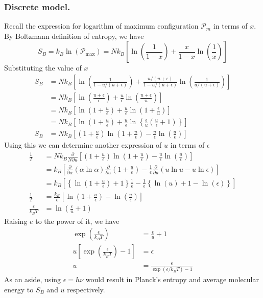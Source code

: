 \documentclass[../../../Main.tex]{subfiles}
\begin{document}
\subsubsection{Discrete model.} Recall the expression for logarithm of maximum configuration $\mathcal{P}_m$ in terms of $x$. By Boltzmann definition of entropy, we have
\begin{equation*}
    S_B=k_B\ln(\mathcal{P}_\text{max})=Nk_B\left[\ln \left(\frac{1}{1-x}\right)+\frac{x}{1-x}\ln \left(\frac{1}{x}\right)\right]
\end{equation*} 
Substituting the value of $x$
\begin{align*}
    S_B&=Nk_B\left[\ln \left(\frac{1}{1-u/(u+\epsilon)}\right)+\frac{u/(u+\epsilon)}{1-u/(u+\epsilon)}\ln \left(\frac{1}{u/(u+\epsilon)}\right)\right]\\
    &=Nk_B\left[\ln \left(\frac{u+\epsilon}{\epsilon}\right)+\frac{u}{\epsilon}\ln \left(\frac{u+\epsilon}{u}\right)\right]\\
    &=Nk_B\left[\ln \left(1+\frac{u}{\epsilon}\right)+\frac{u}{\epsilon}\ln \left(1+\frac{\epsilon}{u}\right)\right]\\
    &=Nk_B\left[\ln \left(1+\frac{u}{\epsilon}\right)+\frac{u}{\epsilon}\ln \left\{\frac{\epsilon}{u}\left(\frac{u}{\epsilon}+1\right)\right\}\right]\\
    S_B&=Nk_B\left[\left(1+\frac{u}{\epsilon} \right) \ln \left(1+\frac{u}{\epsilon}\right)-\frac{u}{\epsilon}\ln\left(\frac{u}{\epsilon}\right)\right]
\end{align*}  
Using this we can determine another expression of $u$ in terms of $\epsilon$
\begin{align*}
    \frac{1}{T}&=Nk_B\frac{\partial}{N\partial u}\left[\left(1+\frac{u}{\epsilon} \right) \ln \left(1+\frac{u}{\epsilon}\right)-\frac{u}{\epsilon}\ln\left(\frac{u}{\epsilon}\right)\right]\\
    &=k_B\left[\frac{\partial}{\partial \alpha}\left(\alpha\ln \alpha\right)\frac{\partial}{\partial u}\left(1+\frac{u}{\epsilon}\right)-\frac{1}{\epsilon}\frac{\partial}{\partial u}\left(u\ln u-u\ln\epsilon\right)\right]\\
    &=k_B\left[\left\{\ln\left(1+\frac{u}{\epsilon} \right)+1\right\}\frac{1}{\epsilon}-\frac{1}{\epsilon}\left\{\ln (u)+1-\ln (\epsilon)\right\}\right]\\
    \frac{1}{T}&=\frac{k_B}{\epsilon}\left[\ln\left(1+\frac{u}{\epsilon}\right)-\ln\left(\frac{u}{\epsilon}\right)\right]\\
    \frac{\epsilon}{k_BT}&=\ln\left(\frac{\epsilon}{u}+1\right)
\end{align*}
Raising $e$ to the power of it, we have 
\begin{align*}
    \exp\left(\frac{\epsilon}{k_BT}\right)&=\frac{\epsilon}{u}+1\\
    u\left[\exp\left(\frac{\epsilon}{k_BT}\right)-1\right]&=\epsilon\\
    u&=\frac{\epsilon}{\exp(\epsilon/k_BT)-1}
\end{align*}
As an aside, using $\epsilon=h\nu$ would result in Planck's entropy and average molecular energy to $S_B$ and $u$ respectively.
\end{document}
